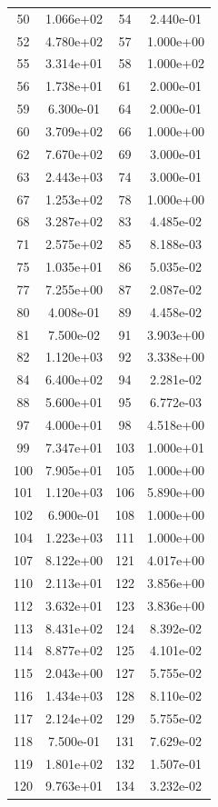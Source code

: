 \documentclass[12pt]{article}
\begin{document}
\begin{longtable}{@{}cccc@{}}
50 & 1.066e+02 & 54 & 2.440e-01 \\
52 & 4.780e+02 & 57 & 1.000e+00 \\
55 & 3.314e+01 & 58 & 1.000e+02 \\
56 & 1.738e+01 & 61 & 2.000e-01 \\
59 & 6.300e-01 & 64 & 2.000e-01 \\
60 & 3.709e+02 & 66 & 1.000e+00 \\
62 & 7.670e+02 & 69 & 3.000e-01 \\
63 & 2.443e+03 & 74 & 3.000e-01 \\
67 & 1.253e+02 & 78 & 1.000e+00 \\
68 & 3.287e+02 & 83 & 4.485e-02 \\
71 & 2.575e+02 & 85 & 8.188e-03 \\
75 & 1.035e+01 & 86 & 5.035e-02 \\
77 & 7.255e+00 & 87 & 2.087e-02 \\
80 & 4.008e-01 & 89 & 4.458e-02 \\
81 & 7.500e-02 & 91 & 3.903e+00 \\
82 & 1.120e+03 & 92 & 3.338e+00 \\
84 & 6.400e+02 & 94 & 2.281e-02 \\
88 & 5.600e+01 & 95 & 6.772e-03 \\
97 & 4.000e+01 & 98 & 4.518e+00 \\
99 & 7.347e+01 & 103 & 1.000e+01 \\
100 & 7.905e+01 & 105 & 1.000e+00 \\
101 & 1.120e+03 & 106 & 5.890e+00 \\
102 & 6.900e-01 & 108 & 1.000e+00 \\
104 & 1.223e+03 & 111 & 1.000e+00 \\
107 & 8.122e+00 & 121 & 4.017e+00 \\
110 & 2.113e+01 & 122 & 3.856e+00 \\
112 & 3.632e+01 & 123 & 3.836e+00 \\
113 & 8.431e+02 & 124 & 8.392e-02 \\
114 & 8.877e+02 & 125 & 4.101e-02 \\
115 & 2.043e+00 & 127 & 5.755e-02 \\
116 & 1.434e+03 & 128 & 8.110e-02 \\
117 & 2.124e+02 & 129 & 5.755e-02 \\
118 & 7.500e-01 & 131 & 7.629e-02 \\
119 & 1.801e+02 & 132 & 1.507e-01 \\
120 & 9.763e+01 & 134 & 3.232e-02 \\

\end{longtable}
\end{document}
